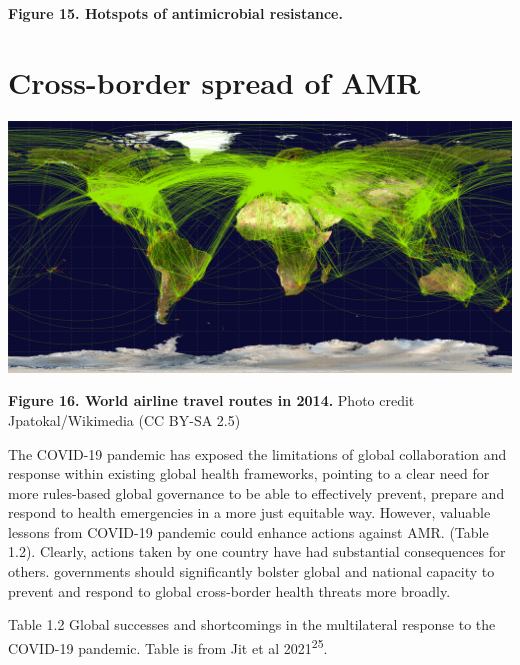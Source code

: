 \documentclass[
]{book}
\begin{document}
\textbf{Figure 15. Hotspots of antimicrobial resistance.}

\hypertarget{cross-border-spread-of-amr}{%
\section*{Cross-border spread of AMR}\label{cross-border-spread-of-amr}}

\includegraphics[width=8.33333in,height=\textheight]{images/worldairlineroute2014.png}

\textbf{Figure 16. World airline travel routes in 2014.} Photo credit Jpatokal/Wikimedia (CC BY-SA 2.5)

The COVID-19 pandemic has exposed the limitations of global collaboration and response within existing global health frameworks, pointing to a clear need for more rules-based global governance to be able to effectively prevent, prepare and respond to health emergencies in a more just equitable way. However, valuable lessons from COVID-19 pandemic could enhance actions against AMR. (Table 1.2). Clearly, actions taken by one country have had substantial consequences for others. governments should significantly bolster global and national capacity to prevent and respond to global cross-border health threats more broadly.

Table 1.2 Global successes and shortcomings in the multilateral response to the COVID-19 pandemic. Table is from Jit et al 2021\textsuperscript{25}.
\end{document}

